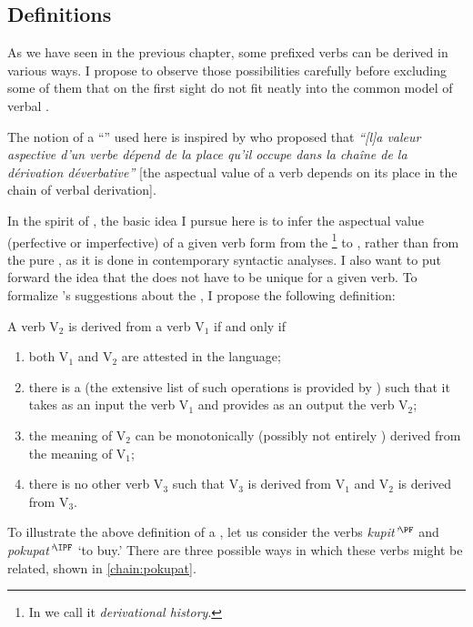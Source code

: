 \subsection{Definitions}\label{section:chains:definition}
As we have seen in the previous chapter, some prefixed verbs can be derived in various ways. I propose to observe those possibilities carefully before excluding some of them that on the first sight do not fit neatly into the common model of verbal .

The notion of a ``'' used here is inspired by \citet{Karcevski:27} who proposed that \textit{``[l]a valeur aspective d'un verbe d\'{e}pend de la place qu'il occupe dans la cha\^{i}ne de la d\'{e}rivation d\'{e}verbative''} [the aspectual value of a verb depends on its place in the chain of verbal derivation].

In the spirit of \citet{Karcevski:27}, the basic idea I pursue here is to infer the aspectual value (perfective or imperfective) of a given verb form from the \footnote{In \citet{ZinovaFilip:14b} we call it \textit{derivational history}.} to , rather than from the pure , as it is done in contemporary syntactic analyses. I also want to put forward the idea that the  does not have to be unique for a given verb. To formalize \citeauthor{Karcevski:27}'s \citeyear{Karcevski:27} suggestions about the , I propose the following definition:
\begin{definition}\label{def:history}
A verb V$_2$ is derived from a verb V$_1$ if and only if
\begin{enumerate}
\item both V$_1$ and V$_2$ are attested in the language;
\item there is a  (the extensive list of such operations is provided by \citealt{Shvedova:82}) such that it takes as an input the verb V$_1$ and provides as an output the verb V$_2$;
\item the meaning of V$_2$ can be monotonically (possibly not entirely ) derived from the meaning of V$_1$;
\item there is no other verb V$_3$ such that V$_3$ is derived from V$_1$ and V$_2$ is derived from V$_3$.
\end{enumerate}
\end{definition}

To illustrate the above definition of a , let us consider the verbs \textit{kupit'$^\PF$} and \textit{pokupat'$^\IPF$} `to buy.' There are three possible ways in which these verbs might be related, shown in \ref{chain:pokupat}.


